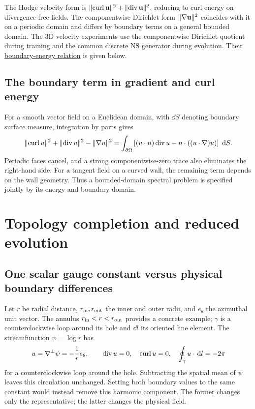 The Hodge velocity form is $\lVert \operatorname{curl}\mathbf u\rVert^2+\lVert \operatorname{div}\mathbf u\rVert^2$, reducing to curl energy on divergence-free fields. The componentwise Dirichlet form $\lVert \nabla\mathbf u\rVert^2$ coincides with it on a periodic domain and differs by boundary terms on a general bounded domain. The 3D velocity experiments use the componentwise Dirichlet quotient during training and the common discrete NS generator during evolution. Their \hyperref[app:boundary-energy]{boundary-energy relation} is given below.

\subsection{The boundary term in gradient and curl energy}
\label{app:boundary-energy}
For a smooth vector field on a Euclidean domain, with $\dd S$ denoting boundary surface measure, integration by parts gives
\begin{equation}
\lVert \operatorname{curl} u\rVert^2+\lVert \operatorname{div} u\rVert^2-\lVert \nabla u\rVert^2
=\int_{\partial\Omega}\left[(u\cdot n)\operatorname{div} u-n\cdot((u\cdot\nabla)u)\right]\,\,\mathrm d S.
\end{equation}
Periodic faces cancel, and a strong componentwise-zero trace also eliminates the right-hand side. For a tangent field on a curved wall, the remaining term depends on the wall geometry. Thus a bounded-domain spectral problem is specified jointly by its energy and boundary domain.

\section{Topology completion and reduced evolution}
\label{app:topology-rom}
\subsection{One scalar gauge constant versus physical boundary differences}
Let $r$ be radial distance, $r_{\rm in},r_{\rm out}$ the inner and outer radii, and $e_\theta$ the azimuthal unit vector. The annulus $r_{\rm in}<r<r_{\rm out}$ provides a concrete example; $\gamma$ is a counterclockwise loop around its hole and $\dd l$ its oriented line element. The streamfunction $\psi=\log r$ has
\begin{equation}
u=\nabla^\perp\psi=-\frac1r e_\theta,\qquad
\operatorname{div} u=0,\quad \operatorname{curl} u=0,\quad
\oint_{\gamma}u\cdot\,\mathrm d l=-2\pi
\end{equation}
for a counterclockwise loop around the hole. Subtracting the spatial mean of $\psi$ leaves this circulation unchanged. Setting both boundary values to the same constant would instead remove this harmonic component. The former changes only the representative; the latter changes the physical field.

